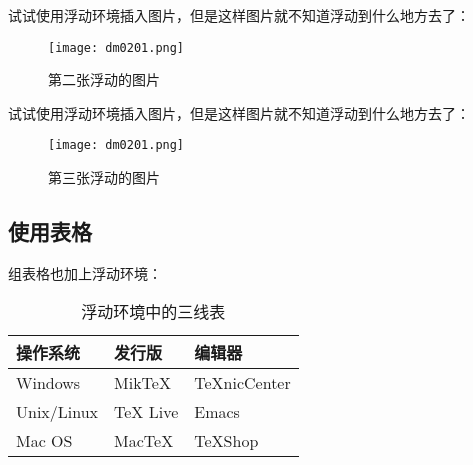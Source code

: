 			试试使用浮动环境插入图片，但是这样图片就不知道浮动到什么地方去了：

			\begin{figure}[htbp]                        %
				\centering                              %
				\texttt{[image: dm0201.png]} %
				\caption{第二张浮动的图片}            %
				\label{dm0202}                %
			\end{figure}

			试试使用浮动环境插入图片，但是这样图片就不知道浮动到什么地方去了：

			\begin{figure}[htbp]                        %
				\centering                              %
				\texttt{[image: dm0201.png]} %
				\caption{第三张浮动的图片}            %
				\label{dm0203}                %
			\end{figure}

		\subsection{使用表格}

			组表格也加上浮动环境：

			\begin{table}[htbp]
				\caption{浮动环境中的三线表}
				\label{tab:threesome}
				\centering
				\begin{tabular}{lll}
					\hline
					操作系统 & 发行版 & 编辑器 \\
					\hline
					Windows & MikTeX & TeXnicCenter \\
					Unix/Linux & TeX Live & Emacs \\
					Mac OS & MacTeX & TeXShop \\
					\hline
				\end{tabular}
			\end{table}

